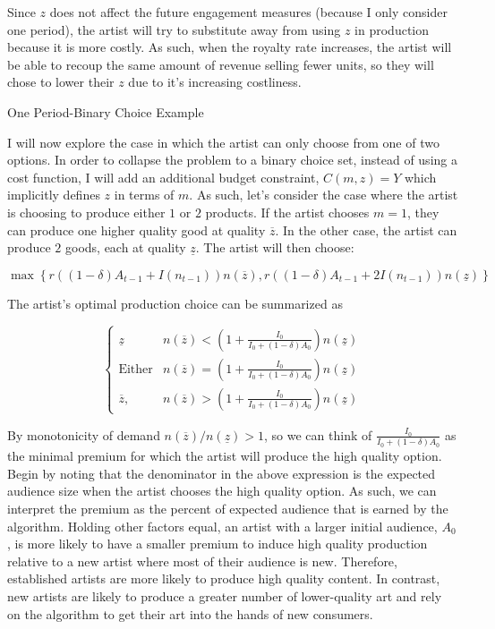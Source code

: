 \documentclass[
]{article}
\begin{document}
Since \(z\) does not affect the future engagement measures (because I
only consider one period), the artist will try to substitute away from
using \(z\) in production because it is more costly. As such, when the
royalty rate increases, the artist will be able to recoup the same
amount of revenue selling fewer units, so they will chose to lower their
\(z\) due to it's increasing costliness.

One Period-Binary Choice Example

I will now explore the case in which the artist can only choose from one
of two options. In order to collapse the problem to a binary choice set,
instead of using a cost function, I will add an additional budget
constraint, \(C(m,z)=Y\) which implicitly defines \(z\) in terms of
\(m\). As such, let's consider the case where the artist is choosing to
produce either \(1\) or \(2\) products. If the artist chooses \(m=1\),
they can produce one higher quality good at quality \(\overline{z}\). In
the other case, the artist can produce \(2\) goods, each at quality
\(\underline{z}\). The artist will then choose:

\begin{equation} \label{eq:binary_choice}
\max\left\{r\left((1-\delta)A_{t-1}+I(n_{t-1})\right)n(\overline{z}),r\left((1-\delta)A_{t-1}+2I(n_{t-1})\right)n(\underline{z}) \right\}
\end{equation}

The artist's optimal production choice can be summarized as

\begin{equation} \label{eq:one_period_behavior}
\begin{cases}
\underline{z} &  n(\overline z) < \left(1+\frac{I_0}{I_0+(1-\delta)A_0}\right)n(\underline z)\\
\textrm{Either} & n(\overline z) = \left(1+\frac{I_0}{I_0+(1-\delta)A_0}\right)n(\underline z) \\
\overline{z}, &  n(\overline z) > \left(1+\frac{I_0}{I_0+(1-\delta)A_0}\right)n(\underline z)
\end{cases}
\end{equation}

By monotonicity of demand \(n(\overline{z})/n(\underline{z})>1\), so we
can think of \(\frac{I_0}{I_0+(1-\delta)A_0}\) as the minimal premium
for which the artist will produce the high quality option. Begin by
noting that the denominator in the above expression is the expected
audience size when the artist chooses the high quality option. As such,
we can interpret the premium as the percent of expected audience that is
earned by the algorithm. Holding other factors equal, an artist with a
larger initial audience, \(A_0\), is more likely to have a smaller
premium to induce high quality production relative to a new artist where
most of their audience is new. Therefore, established artists are more
likely to produce high quality content. In contrast, new artists are
likely to produce a greater number of lower-quality art and rely on the
algorithm to get their art into the hands of new consumers.
\end{document}
